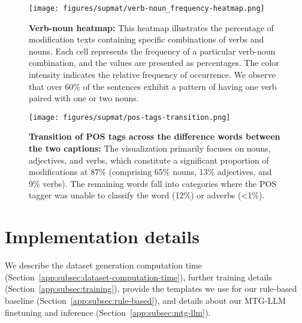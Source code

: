 \begin{figure} \centering
  \texttt{[image: figures/supmat/verb-noun\_frequency-heatmap.png]}
  \vspace{-0.2cm}
  \caption{\textbf{Verb-noun heatmap:} 
  {This heatmap illustrates the percentage of modification texts containing specific combinations of verbs and nouns. 
    Each cell represents the frequency of a particular verb-noun combination, and the values are presented as percentages. The color intensity indicates the relative frequency of occurrence.
    We observe that over 60\% of the sentences exhibit a pattern of having one verb paired with one or two nouns.}
  }
  \label{app:fig:verb-noun-heatmap}
\end{figure}

\begin{figure} \centering
  \texttt{[image: figures/supmat/pos-tags-transition.png]}
  \vspace{-0.2cm}
  \caption{\textbf{Transition of POS tags across the difference words between the two captions:} 
  {The visualization primarily focuses on nouns, adjectives, and verbs, which constitute a significant proportion of modifications at 87\% (comprising 65\% nouns, 13\% adjectives, and 9\% verbs). The remaining words fall into categories where the POS tagger was unable to classify the word (12\%) or adverbs (\textless 1\%).
}
  }
  \label{app:fig:pos-transitions}
\end{figure}

\section{Implementation details}
\label{app:sec:implementation-details}
We describe the dataset generation computation time (Section~\ref{app:subsec:dataset-computation-time}),
further training details (Section~\ref{app:subsec:training}),
provide the templates we use for our rule-based baseline (Section~\ref{app:subsec:rule-based}),
and details about our MTG-LLM finetuning and inference (Section~\ref{app:subsec:mtg-llm}).

